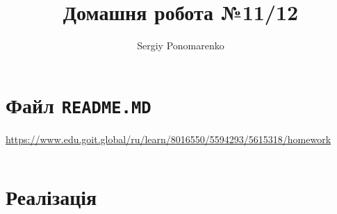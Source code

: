 \documentclass[14pt]{extarticle}
\title{Домашня робота №11/12}
\author{Sergiy Ponomarenko}
\begin{document}
\maketitle


\section{Файл \texttt{README.MD}}




\begin{center}\scriptsize
\url{https://www.edu.goit.global/ru/learn/8016550/5594293/5615318/homework}
\end{center}

\inputminted[fontsize=\scriptsize,%
 numbersep = 1pt,%
 breaklines=true,%
 framesep=1mm,%
 baselinestretch=0.95,%
 bgcolor=gray!5,%
 fontsize=\scriptsize,%
 linenos]{text}{readme.md}


 \section{Реалізація}

\inputminted[fontsize=\scriptsize,%
 numbersep = 1pt,%
 breaklines=true,%
 framesep=1mm,%
 baselinestretch=0.95,%
 bgcolor=gray!5,%
 fontsize=\footnotesize,%
 linenos]{python}{console_bot.py}
\end{document}

